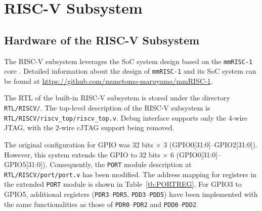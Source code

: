 \section{RISC-V Subsystem}
\subsection{Hardware of the RISC-V Subsystem}
The RISC-V subsystem leverages the SoC system design based on the \texttt{mmRISC-1} core \cite{mmRISC-1}. Detailed information about the design of \texttt{mmRISC-1} and its SoC system can be found at \url{https://github.com/munetomo-maruyama/mmRISC-1}.

The RTL of the built-in RISC-V subsystem is stored under the directory \texttt{RTL/RISCV/}. The top-level description of the RISC-V subsystem is \texttt{RTL/RISCV/riscv\_top/riscv\_top.v}. Debug interface supports only the 4-wire JTAG, with the 2-wire cJTAG support being removed.

The original configuration for GPIO was 32 bits × 3 (GPIO0[31:0]–GPIO2[31:0]). However, this system extends the GPIO to 32 bits × 6 (GPIO0[31:0]–GPIO5[31:0]). Consequently, the \texttt{PORT} module description at \texttt{RTL/RISCV/port/port.v} has been modified. The address mapping for registers in the extended \texttt{PORT} module is shown in Table~\ref{tb:PORTREG}. For GPIO3 to GPIO5, additional registers (\texttt{PDR3}–\texttt{PDR5}, \texttt{PDD3}–\texttt{PDD5}) have been implemented with the same functionalities as those of \texttt{PDR0}–\texttt{PDR2} and \texttt{PDD0}–\texttt{PDD2}.

